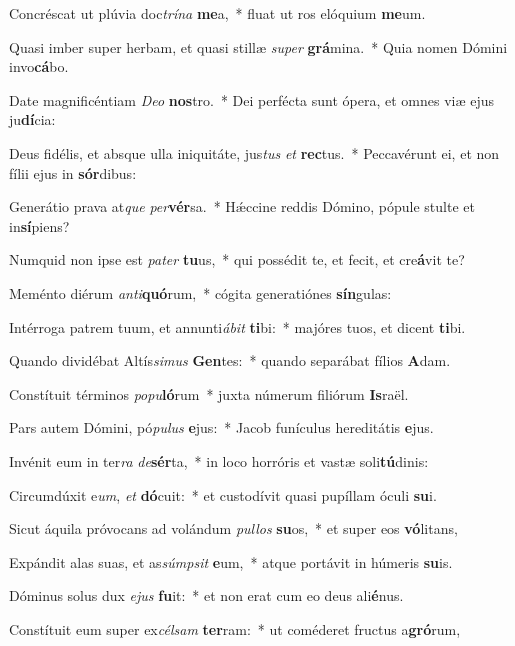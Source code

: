 \item Concréscat ut plúvia doc\textit{trí}\textit{na} \textbf{me}a,~* fluat ut ros elóquium \textbf{me}um.
\item Quasi imber super herbam, et quasi stillæ \textit{su}\textit{per} \textbf{grá}mina.~* Quia nomen Dómini invo\textbf{cá}bo.
\item Date magnificéntiam \textit{De}\textit{o} \textbf{nos}tro.~* Dei perfécta sunt ópera, et omnes viæ ejus ju\textbf{dí}cia:
\item Deus fidélis, et absque ulla iniquitáte, jus\textit{tus} \textit{et} \textbf{rec}tus.~* Peccavérunt ei, et non fílii ejus in \textbf{sór}dibus:
\item Generátio prava at\textit{que} \textit{per}\textbf{vér}sa.~* Hǽccine reddis Dómino, pópule stulte et in\textbf{sí}piens?
\item Numquid non ipse est \textit{pa}\textit{ter} \textbf{tu}us,~* qui possédit te, et fecit, et cre\textbf{á}vit te?
\item Meménto diérum \textit{an}\textit{ti}\textbf{quó}rum,~* cógita generatiónes \textbf{sín}gulas:
\item Intérroga patrem tuum, et annunti\textit{á}\textit{bit} \textbf{ti}bi:~* majóres tuos, et dicent \textbf{ti}bi.
\item Quando dividébat Altís\textit{si}\textit{mus} \textbf{Gen}tes:~* quando separábat fílios \textbf{A}dam.
\item Constítuit términos \textit{po}\textit{pu}\textbf{ló}rum~* juxta númerum filiórum \textbf{Is}raël.
\item Pars autem Dómini, pó\textit{pu}\textit{lus} \textbf{e}jus:~* Jacob funículus hereditátis \textbf{e}jus.
\item Invénit eum in ter\textit{ra} \textit{de}\textbf{sér}ta,~* in loco horróris et vastæ soli\textbf{tú}dinis:
\item Circumdúxit e\textit{um}, \textit{et} \textbf{dó}cuit:~* et custodívit quasi pupíllam óculi \textbf{su}i.
\item Sicut áquila próvocans ad volándum \textit{pul}\textit{los} \textbf{su}os,~* et super eos \textbf{vó}litans,
\item Expándit alas suas, et as\textit{súmp}\textit{sit} \textbf{e}um,~* atque portávit in húmeris \textbf{su}is.
\item Dóminus solus dux \textit{e}\textit{jus} \textbf{fu}it:~* et non erat cum eo deus ali\textbf{é}nus.
\item Constítuit eum super ex\textit{cél}\textit{sam} \textbf{ter}ram:~* ut coméderet fructus a\textbf{gró}rum,
